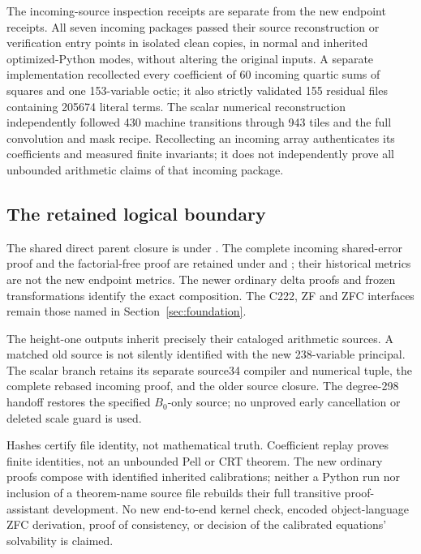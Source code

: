 The incoming-source inspection receipts are separate from the new endpoint
receipts. All seven incoming packages passed their source reconstruction or
verification entry points in isolated clean copies, in normal and inherited
optimized-Python modes, without altering the original inputs. A separate
implementation recollected every coefficient of 60 incoming quartic
sums of squares and one 153-variable octic; it also strictly validated
155 residual files containing 205674 literal terms. The scalar numerical
reconstruction independently followed 430 machine transitions through
943 tiles and the full convolution and mask recipe. Recollecting an incoming array authenticates its coefficients
and measured finite invariants; it does not independently prove all
unbounded arithmetic claims of that incoming package.

\subsection{The retained logical boundary}
The shared direct parent closure is under .
The complete incoming shared-error proof and the factorial-free proof are
retained under  and
; their historical metrics are not the new
endpoint metrics. The newer ordinary delta proofs and frozen transformations
identify the exact composition. The C222, ZF and ZFC interfaces remain
those named in Section~\ref{sec:foundation}.

The height-one outputs inherit precisely their cataloged arithmetic
sources. A matched old source is not silently identified with the new
238-variable principal. The scalar branch retains its separate source34
compiler and numerical tuple, the complete rebased incoming proof, and
the older source closure. The degree-298 handoff restores the specified
$B_0$-only source; no unproved early cancellation or deleted scale guard
is used.

Hashes certify file identity, not mathematical truth. Coefficient replay
proves finite identities, not an unbounded Pell or CRT theorem. The new
ordinary proofs compose with identified inherited calibrations; neither
a Python run nor inclusion of a theorem-name source file rebuilds their
full transitive proof-assistant development. No new end-to-end kernel check,
encoded object-language ZFC derivation, proof of consistency, or decision
of the calibrated equations' solvability is claimed.
